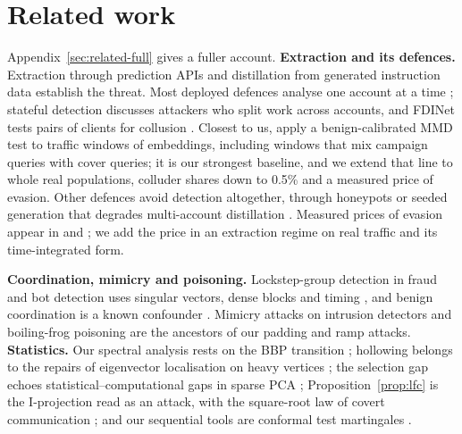 \section{Related work}
\label{sec:related}

Appendix~\ref{sec:related-full} gives a fuller account. \textbf{Extraction and its defences.} Extraction through prediction APIs \citep{tramer2016stealing,orekondy2019knockoff,pal2020activethief} and distillation from generated instruction data \citep{hinton2015distilling,taori2023alpaca,yu2024metamath} establish the threat. Most deployed defences analyse one account at a time \citep{juuti2019prada,zhang2021seat,sadeghzadeh2023hoda}; stateful detection \citep{chen2020stateful,li2022blacklight} discusses attackers who split work across accounts, and FDINet tests pairs of clients for collusion \citep{yao2023fdinet}. Closest to us, \citet{liu2026embarrassingly} apply a benign-calibrated MMD test to traffic windows of embeddings, including windows that mix campaign queries with cover queries; it is our strongest baseline, and we extend that line to whole real populations, colluder shares down to 0.5\% and a measured price of evasion. Other defences avoid detection altogether, through honeypots \citep{dai2026knowledgetrap,wang2025honeypotnet} or seeded generation that degrades multi-account distillation \citep{diao2026lads}. Measured prices of evasion appear in \citet{liu2026embarrassingly} and \citet{zhang2021seat}; we add the price in an extraction regime on real traffic and its time-integrated form.

\textbf{Coordination, mimicry and poisoning.} Lockstep-group detection in fraud and bot detection uses singular vectors, dense blocks and timing \citep{prakash2010eigenspokes,beutel2013copycatch,hooi2016fraudar,cao2014synchrotrap}, and benign coordination is a known confounder \citep{vargas2020detection}. Mimicry attacks on intrusion detectors \citep{wagner2002mimicry} and boiling-frog poisoning \citep{rubinstein2009antidote} are the ancestors of our padding and ramp attacks. \textbf{Statistics.} Our spectral analysis rests on the BBP transition \citep{baik2005phase,benaych2011eigenvalues}; hollowing belongs to the repairs of eigenvector localisation on heavy vertices \citep{alt2023localized,le2017concentration}; the selection gap echoes statistical--computational gaps in sparse PCA \citep{berthet2013optimal}; Proposition~\ref{prop:lfc} is the I-projection \citep{csiszar1975idivergence} read as an attack, with the square-root law of covert communication \citep{ker2007capacity,bash2013limits}; and our sequential tools are conformal test martingales \citep{vovk2021testing}.
